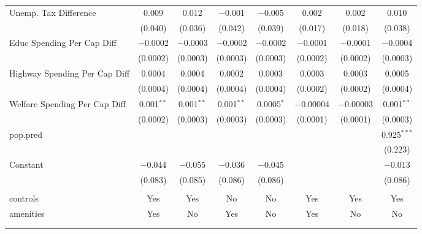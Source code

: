 \begin{table}[!htbp]
\begin{tabular}{@{\extracolsep{5pt}}lccccccc}
  Unemp. Tax Difference & 0.009 & 0.012 & $-$0.001 & $-$0.005 & 0.002 & 0.002 & 0.010 \\ 
  & (0.040) & (0.036) & (0.042) & (0.039) & (0.017) & (0.018) & (0.038) \\ 
  Educ Spending Per Cap Diff & $-$0.0002 & $-$0.0003 & $-$0.0002 & $-$0.0002 & $-$0.0001 & $-$0.0001 & $-$0.0004 \\ 
  & (0.0002) & (0.0003) & (0.0003) & (0.0003) & (0.0002) & (0.0002) & (0.0003) \\ 
  Highway Spending Per Cap Diff & 0.0004 & 0.0004 & 0.0002 & 0.0003 & 0.0003 & 0.0003 & 0.0005 \\ 
  & (0.0004) & (0.0004) & (0.0004) & (0.0004) & (0.0002) & (0.0002) & (0.0004) \\ 
  Welfare Spending Per Cap Diff & 0.001$^{**}$ & 0.001$^{**}$ & 0.001$^{**}$ & 0.0005$^{*}$ & $-$0.00004 & $-$0.00003 & 0.001$^{**}$ \\ 
  & (0.0002) & (0.0003) & (0.0003) & (0.0003) & (0.0001) & (0.0001) & (0.0003) \\ 
  pop.pred &  &  &  &  &  &  & 0.925$^{***}$ \\ 
  &  &  &  &  &  &  & (0.223) \\ 
  Constant & $-$0.044 & $-$0.055 & $-$0.036 & $-$0.045 &  &  & $-$0.013 \\ 
  & (0.083) & (0.085) & (0.086) & (0.086) &  &  & (0.086) \\ 
 \hline \\[-1.8ex] 
controls & Yes & Yes & No & No & Yes & Yes & Yes \\ 
amenities & Yes & No & Yes & No & Yes & No & No \\ 
\hline \\[-1.8ex] 
\hline 
\hline \\[-1.8ex] 
\end{tabular} 
\end{table} 
